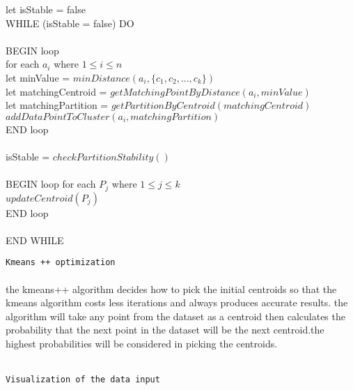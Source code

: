 \documentclass[a4paper]{letter}
\begin{document}
\begin{flushleft}
\begin{flushleft}
\textsf{\large let isStable = false \\
	WHILE (isStable = false) DO \\ \ \\
	 BEGIN loop \\ \large for each $a_i$ where $1 \leq i \leq n$ \\ let minValue = $minDistance(a_i , \{c_1,c_2 , ... ,c_k \})$ \\ let matchingCentroid = $  getMatchingPointByDistance(a_i,minValue) $ \\
let matchingPartition = $getPartitionByCentroid(matchingCentroid)$ \\
$addDataPointToCluster(a_i,matchingPartition)$ \\
END loop \\ \ \\
isStable = $checkPartitionStability()$ \\ \ \\
BEGIN loop 
for each $P_j$ where $1 \leq j \leq k$ \\ 
$updateCentroid(P_j)$ \\ END loop \\ \ \\
END WHILE
 }
\end{flushleft}
\end{flushleft}
\clearpage
\centering
\texttt{\Large Kmeans ++ optimization}
\\ \ \\
\textsf{the kmeans++ algorithm decides how to pick the initial centroids so that the kmeans algorithm costs less iterations and always produces accurate results. the algorithm will take any point from the dataset as a centroid then calculates the probability that the next point in the dataset will be the next centroid.the highest probabilities will be considered in picking the centroids.} \\ \ \\
\hspace*{1cm}
\begin{center}
\texttt{\huge Visualization of the data input}
\end{center}
\hspace*{1.5cm}
\begin{center}
\end{center}
\end{document}
